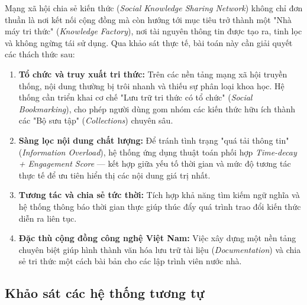 \documentclass[13pt,a4paper,oneside]{extreport}
\numberwithin{equation}{chapter}
\numberwithin{figure}{chapter}
\numberwithin{table}{chapter}
\begin{document}
Mạng xã hội chia sẻ kiến thức (\textit{Social Knowledge Sharing Network}) không chỉ đơn thuần là nơi kết nối cộng đồng mà còn hướng tới mục tiêu trở thành một "Nhà máy tri thức" (\textit{Knowledge Factory}), nơi tài nguyên thông tin được tạo ra, tinh lọc và không ngừng tái sử dụng. Qua khảo sát thực tế, bài toán này cần giải quyết các thách thức sau:

\begin{enumerate}
    \item \textbf{Tổ chức và truy xuất tri thức:} Trên các nền tảng mạng xã hội truyền thống, nội dung thường bị trôi nhanh và thiếu sự phân loại khoa học. Hệ thống cần triển khai cơ chế "Lưu trữ tri thức có tổ chức" (\textit{Social Bookmarking}), cho phép người dùng gom nhóm các kiến thức hữu ích thành các "Bộ sưu tập" (\textit{Collections}) chuyên sâu.

    \item \textbf{Sàng lọc nội dung chất lượng:} Để tránh tình trạng "quá tải thông tin" (\textit{Information Overload}), hệ thống ứng dụng thuật toán phối hợp \textit{Time-decay + Engagement Score} — kết hợp giữa yếu tố thời gian và mức độ tương tác thực tế để ưu tiên hiển thị các nội dung giá trị nhất.

    \item \textbf{Tương tác và chia sẻ tức thời:} Tích hợp khả năng tìm kiếm ngữ nghĩa và hệ thống thông báo thời gian thực giúp thúc đẩy quá trình trao đổi kiến thức diễn ra liên tục.

    \item \textbf{Đặc thù cộng đồng công nghệ Việt Nam:} Việc xây dựng một nền tảng chuyên biệt giúp hình thành văn hóa lưu trữ tài liệu (\textit{Documentation}) và chia sẻ tri thức một cách bài bản cho các lập trình viên nước nhà.
\end{enumerate}

\subsection{Khảo sát các hệ thống tương tự}
\end{document}
